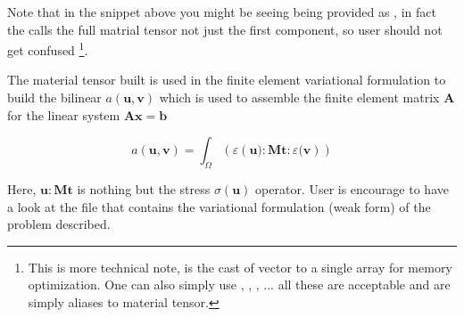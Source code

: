 Note that in the snippet above you might be seeing  being
provided as , in fact the  calls
the full matrial tensor not just the first component, so user should not
get confused
\footnote{This is more technical note,  is the cast of  vector to a single array for memory optimization. One can also simply use , , , ... all these are acceptable and are simply aliases to material tensor.}.

The material tensor  built is used in the finite element
variational formulation to build the bilinear
\(a(\mathbf{u},\mathbf{v})\) which is used to assemble the finite
element matrix \(\mathbf{A}\) for the linear system
\(\mathbf{Ax} = \mathbf{b}\)

\[
a(\mathbf{u},\mathbf{v}) = \int_{\Omega}(
                 \varepsilon \left(\mathbf{u}):\mathbf{Mt}:\varepsilon(\mathbf{v}\right)
               )
\]

Here, \(\mathbf{u}:\mathbf{Mt}\) is nothing but the stress
\(\sigma(\mathbf{u})\) operator. User is encourage to have a look at the
 file that contains the variational
formulation (weak form) of the problem described.

